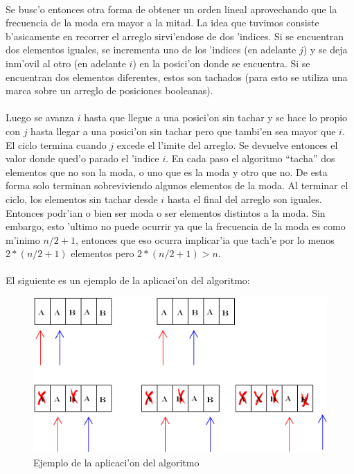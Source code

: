 \paragraph{}
Se busc'o entonces otra forma de  obtener un orden lineal aprovechando que la frecuencia de la moda 
era mayor a la mitad. La idea que tuvimos consiste b'asicamente en recorrer el arreglo sirvi'endose de 
dos 'indices. Si se encuentran dos elementos iguales, se incrementa uno de los 'indices (en adelante $j$) 
y se deja inm'ovil al otro (en adelante $i$) en la posici'on donde se encuentra. Si se encuentran dos 
elementos diferentes, estos son tachados (para esto se utiliza una marca sobre un arreglo de posiciones booleanas). 
\paragraph{}
Luego se avanza $i$ hasta que llegue a una posici'on sin tachar y se hace lo propio con $j$ hasta llegar 
a una posici'on sin tachar pero que tambi'en sea mayor que $i$. El ciclo termina cuando $j$ excede el l'imite 
del arreglo. Se devuelve entonces el valor donde qued'o parado el 'indice $i$. 
En cada paso el algoritmo ``tacha'' dos elementos que no son la moda, o uno que es la moda y otro que no. 
De esta forma solo terminan sobreviviendo algunos elementos de la moda. Al terminar el ciclo, los elementos
sin tachar desde $i$ hasta el final del arreglo son iguales. Entonces podr'ian o bien ser moda o ser elementos 
distintos a la moda. Sin embargo, esto 'ultimo no puede ocurrir ya que la frecuencia de la moda es como m'inimo 
$n/2+1$, entonces que eso ocurra implicar'ia que tach'e por lo menos $2*(n/2+1)$ elementos pero $2*(n/2+1) > n$.
\paragraph{}
El siguiente es un ejemplo de la aplicaci'on del algoritmo:\\
\begin{figure}[H]
\centering
\includegraphics[scale=0.7]{./ejemplo.png}
\caption{Ejemplo de la aplicaci'on del algoritmo}
\end{figure}
